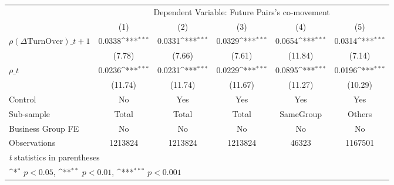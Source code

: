 {
\def\sym#1{\ifmmode^{#1}\else\(^{#1}\)\fi}
\begin{tabular}{l*{5}{c}}
\hline\hline
                &\multicolumn{5}{c}{Dependent Variable:  Future Pairs's co-movement}                           \\\cmidrule(lr){2-6}
                &\multicolumn{1}{c}{(1)}         &\multicolumn{1}{c}{(2)}         &\multicolumn{1}{c}{(3)}         &\multicolumn{1}{c}{(4)}         &\multicolumn{1}{c}{(5)}         \\
\hline
 $ {\rho(\Delta \text{TurnOver})\_{t+1}} $ &   0.0338\sym{***}&   0.0331\sym{***}&   0.0329\sym{***}&   0.0654\sym{***}&   0.0314\sym{***}\\
                &   (7.78)         &   (7.66)         &   (7.61)         &  (11.84)         &   (7.14)         \\
[1em]
 $ {\rho\_t} $   &   0.0236\sym{***}&   0.0231\sym{***}&   0.0229\sym{***}&   0.0895\sym{***}&   0.0196\sym{***}\\
                &  (11.74)         &  (11.74)         &  (11.67)         &  (11.27)         &  (10.29)         \\
\hline
Control         &       No         &      Yes         &      Yes         &      Yes         &      Yes         \\
Sub-sample      &    Total         &    Total         &    Total         &SameGroup         &   Others         \\
Business Group FE&       No         &       No         &       No         &       No         &       No         \\
Observations    &  1213824         &  1213824         &  1213824         &    46323         &  1167501         \\
\hline\hline
\multicolumn{6}{l}{\footnotesize \textit{t} statistics in parentheses}\\
\multicolumn{6}{l}{\footnotesize \sym{*} \(p<0.05\), \sym{**} \(p<0.01\), \sym{***} \(p<0.001\)}\\
\end{tabular}
}
